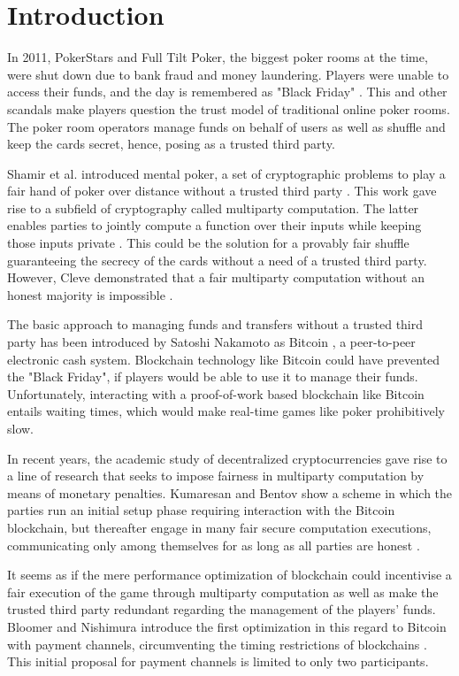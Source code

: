 \section{Introduction}

In 2011, PokerStars and Full Tilt Poker, the biggest poker rooms at the time, were shut down due to bank fraud and money laundering. Players were unable to access their funds, and the day is remembered as "Black Friday" \cite{treasury11}. This and other scandals make players question the trust model of traditional online poker rooms. The poker room operators manage funds on behalf of users as well as shuffle and keep the cards secret, hence, posing as a trusted third party.

Shamir et al. \cite{shamir81} introduced mental poker, a set of cryptographic problems to play a fair hand of poker over distance without a trusted third party \cite{wikiMental}. This work gave rise to a subfield of cryptography called multiparty computation. The latter enables parties to jointly compute a function over their inputs while keeping those inputs private \cite{wikiMPC}. This could be the solution for a provably fair shuffle guaranteeing the secrecy of the cards without a need of a trusted third party. However, Cleve demonstrated that a fair multiparty computation without an honest majority is impossible \cite{cleve86}.

The basic approach to managing funds and transfers without a trusted third party has been introduced by Satoshi Nakamoto as Bitcoin \cite{nakamoto08}, a peer-to-peer electronic cash system. Blockchain technology like Bitcoin could have prevented the "Black Friday", if players would be able to use it to manage their funds. Unfortunately, interacting with a proof-of-work based blockchain like Bitcoin entails waiting times, which would make real-time games like poker prohibitively slow.

In recent years, the academic study of decentralized cryptocurrencies gave rise to a line of research that seeks to impose fairness in multiparty computation by means of monetary penalties. Kumaresan and Bentov show a scheme in which the parties run an initial setup phase requiring interaction with the Bitcoin blockchain, but thereafter engage in many fair secure computation executions, communicating only among themselves for as long as all parties are honest \cite{bentov14}.

It seems as if the mere performance optimization of blockchain could incentivise a fair execution of the game through multiparty computation as well as make the trusted third party redundant regarding the management of the players' funds. Bloomer and Nishimura introduce the first optimization in this regard to Bitcoin with payment channels, circumventing the timing restrictions of blockchains \cite{bloomer14}. This initial proposal for payment channels is limited to only two participants.

